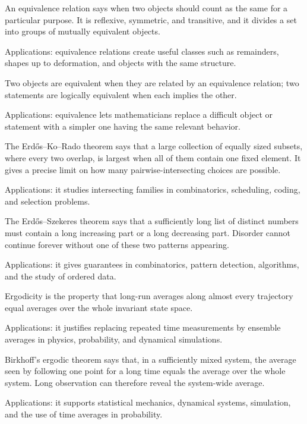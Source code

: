 An equivalence relation says when two objects should count as the same for a particular purpose. It is reflexive, symmetric, and transitive, and it divides a set into groups of mutually equivalent objects. \par\noindent Applications: equivalence relations create useful classes such as remainders, shapes up to deformation, and objects with the same structure.

Two objects are equivalent when they are related by an equivalence relation; two statements are logically equivalent when each implies the other. \par\noindent Applications: equivalence lets mathematicians replace a difficult object or statement with a simpler one having the same relevant behavior.

The Erdős--Ko--Rado theorem says that a large collection of equally sized subsets, where every two overlap, is largest when all of them contain one fixed element. It gives a precise limit on how many pairwise-intersecting choices are possible. \par\noindent Applications: it studies intersecting families in combinatorics, scheduling, coding, and selection problems.

The Erdős--Szekeres theorem says that a sufficiently long list of distinct numbers must contain a long increasing part or a long decreasing part. Disorder cannot continue forever without one of these two patterns appearing. \par\noindent Applications: it gives guarantees in combinatorics, pattern detection, algorithms, and the study of ordered data.

Ergodicity is the property that long-run averages along almost every trajectory equal averages over the whole invariant state space. \par\noindent Applications: it justifies replacing repeated time measurements by ensemble averages in physics, probability, and dynamical simulations.

Birkhoff's ergodic theorem says that, in a sufficiently mixed system, the average seen by following one point for a long time equals the average over the whole system. Long observation can therefore reveal the system-wide average. \par\noindent Applications: it supports statistical mechanics, dynamical systems, simulation, and the use of time averages in probability.

